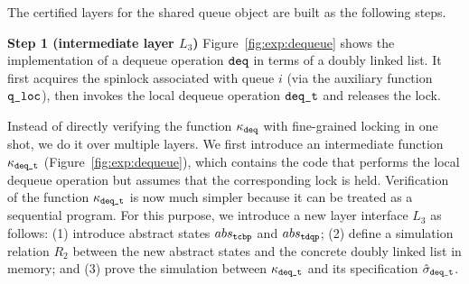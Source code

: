 {

The certified layers for the shared queue object
are built as the following steps.

\noindent\textbf{Step 1 (intermediate layer $L_3$)} 
Figure~\ref{fig:exp:dequeue} shows
the implementation of a dequeue operation ${\texttt{deq}}$ in terms of a doubly linked
list.
It first acquires the spinlock associated with queue $i$
(via the auxiliary function ${\texttt{q\_loc}}$),
then invokes the local dequeue operation ${\texttt{deq}}{\texttt{\_t}}$
and releases the lock.
Instead of directly verifying the function $\kappa_{{\texttt{deq}}}$
with fine-grained locking in one shot, we do it over
multiple layers.
We first introduce an intermediate function
$\kappa_{{\texttt{deq}}{\texttt{\_t}}}$ (\cf Figure~\ref{fig:exp:dequeue}), which contains
the code that performs the local dequeue operation but assumes that
the corresponding lock is held.
Verification of the function $\kappa_{{\texttt{deq}}{\texttt{\_t}}}$ is now much
simpler because it can be treated as a sequential program.
For this purpose, we introduce a new layer interface $L_3$ as follows:
(1) introduce abstract states $abs_{\texttt{tcbp}}$ and $abs_{\texttt{tdqp}}$;
(2) define a simulation relation $R_{2}$ between the new abstract states
and the concrete doubly linked list in memory;
and (3) prove the simulation between
$\kappa_{{\texttt{deq}}{\texttt{\_t}}}$ and its specification
$\hat{\sigma}_{{\texttt{deq}}{\texttt{\_t}}}$.

}
